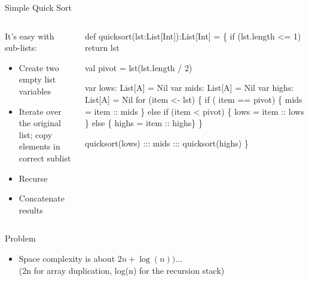 \begin{frame}[fragile]{Simple Quick Sort}
  \begin{columns}
    \begin{column}{.44\linewidth}
      \begin{block}{It's easy with sub-lists:}
        \begin{itemize}
        \item Create two empty list variables
        \item Iterate over the original list;
          copy elements in correct sublist
        \item Recurse
        \item Concatenate results
        \end{itemize}
      \end{block}
    \end{column}
    \begin{column}{.55\linewidth}
    \begin{boitecode}{}
def quicksort(lst:List[Int]):List[Int] = \{
  if (lst.length <= 1) 
    return lst
  
  val pivot = lst(lst.length / 2)      

  var lows: List[A] = Nil
  var mids: List[A] = Nil
  var highs: List[A] = Nil
  for (item <- lst) \{ 
    if ( item == pivot)    \{ mids  = item :: mids \}
    else if (item < pivot) \{ lows  = item :: lows \}
    else                   \{ highs = item :: highs\}
  \}

  quicksort(lows) ::: mids ::: quicksort(highs) 
\}      
    \end{boitecode}      
    \end{column}
  \end{columns}

  \begin{block}{Problem}
    \begin{itemize}
    \item Space complexity is about $2n+\log(n))$...\\
      {\small (2n for array duplication, log(n) for the recursion stack)}
    \end{itemize}
  \end{block}
\end{frame}
